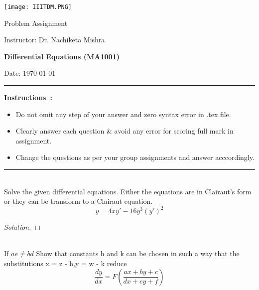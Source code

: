 \documentclass[12pt]{article}
\newenvironment{problem}[2][Problem]{\begin{trivlist}
\item[\hskip \labelsep {\bfseries #1}\hskip \labelsep {\bfseries #2.}]}{\end{trivlist}}
\begin{document}
 
	\begin{minipage}[l]{0.1\textwidth}
		\noindent
		\texttt{[image: IIITDM.PNG]} 
	\end{minipage}
\hfill
\begin{minipage}[c]{0.8\textwidth}
	\begin{center}
		{\Large	Problem Assignment \par
			\small Instructor: Dr. Nachiketa Mishra	\par
	\large \textbf{Differential Equations (MA1001)}	\par
\small  Date: \today}
	\end{center}
\end{minipage}
 \hspace{-0.0cm}\rule[-0.0cm]{16.85cm}{0.02cm}
 {\small \bfseries Instructions~:~}\\[-3ex]
\begin{itemize}
\item Do not omit any step of your answer and zero syntax error in .tex file.
\item Clearly answer each question \& avoid any error for  scoring full mark in assignment.
\item Change the questions as per your group assignments and answer acccordingly.
\end{itemize}
\hspace{-0.0cm}\rule[-0.0cm]{16.85cm}{0.02cm}
\begin{problem}{1}
\text{ }\\
 Solve the given differential equations. Either the equations are in Clairaut’s form or
they can be transform to a Clairaut equation.
$$y = 4xy'-16y^3(y')^2$$
\end{problem}
 
\begin{proof}[Solution]

\end{proof}
 
\begin{problem}{2}
\text{ }\\
If $ae \neq bd$ Show that constants h and k can be chosen in such a way that the substitutions x =  z - h,y = w - k  reduce\\

$$\frac{dy}{dx} = F(\frac{ax+by+c}{dx+ey+f})$$
\end{problem}
 
\end{document}
